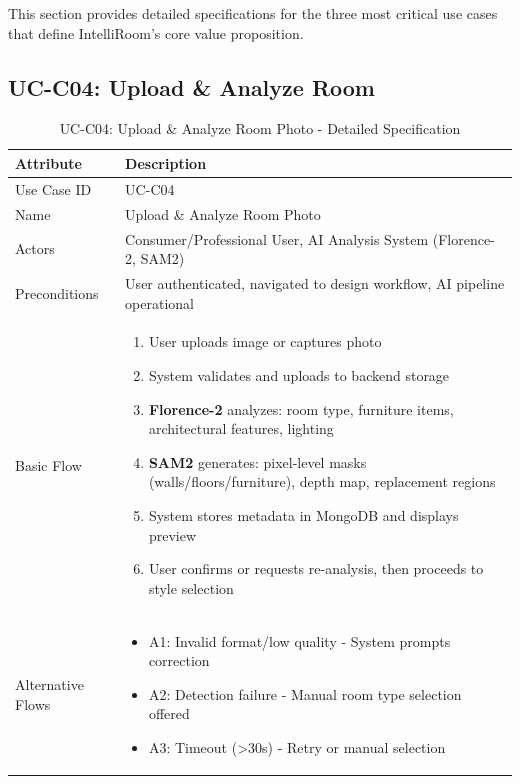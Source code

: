This section provides detailed specifications for the three most critical use cases that define IntelliRoom's core value proposition.

\subsection{UC-C04: Upload \& Analyze Room}
\label{sec:uc_upload_analyze}

\begin{table}[h]
\centering
\caption{UC-C04: Upload \& Analyze Room Photo - Detailed Specification}
\label{tab:uc_upload_detail}
\begin{tabular}{p{3cm}p{11cm}}
\toprule
\textbf{Attribute} & \textbf{Description} \\
\midrule
Use Case ID & UC-C04 \\
\midrule
Name & Upload \& Analyze Room Photo \\
\midrule
Actors & Consumer/Professional User, AI Analysis System (Florence-2, SAM2) \\
\midrule
Preconditions & User authenticated, navigated to design workflow, AI pipeline operational \\
\midrule
Basic Flow &
\begin{enumerate}[leftmargin=*,noitemsep,topsep=0pt]
    \item User uploads image or captures photo
    \item System validates and uploads to backend storage
    \item \textbf{Florence-2} analyzes: room type, furniture items, architectural features, lighting
    \item \textbf{SAM2} generates: pixel-level masks (walls/floors/furniture), depth map, replacement regions
    \item System stores metadata in MongoDB and displays preview
    \item User confirms or requests re-analysis, then proceeds to style selection
\end{enumerate} \\
\midrule
Alternative Flows &
\begin{itemize}[leftmargin=*,noitemsep,topsep=0pt]
    \item A1: Invalid format/low quality - System prompts correction
    \item A2: Detection failure - Manual room type selection offered
    \item A3: Timeout (>30s) - Retry or manual selection

\end{itemize}
\end{tabular}
\end{table}
